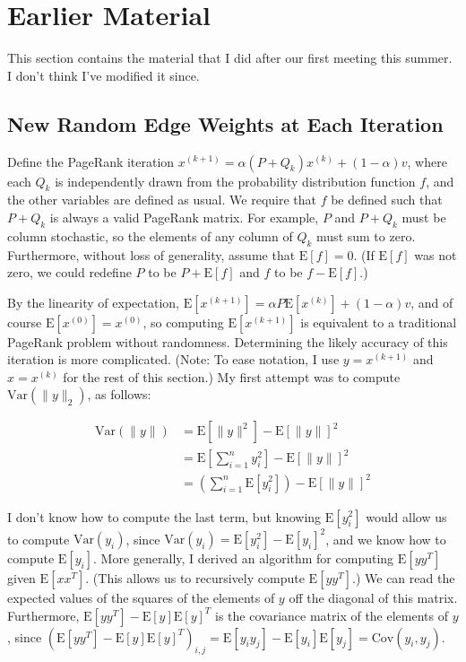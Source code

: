 \documentclass{article}
\newcommand \E[1] {\mathrm E \left[#1\right]} %
\newcommand \Var[1] {\mathrm {Var} \left(#1\right)} %
\newcommand \Cov[2] {\mathrm {Cov} (#1, #2)} %
\newcommand \vitr [2] {#1^{(#2)}} %
\begin{document}
\VerbatimFootnotes

\section{Earlier Material}

This section contains the material that I did after our first meeting this summer. I don't think I've modified it since.

\subsection{New Random Edge Weights at Each Iteration}

Define the PageRank iteration $\vitr x {k+1} =\alpha (P+Q_k)\vitr x k
+ (1-\alpha)v$, where each $Q_k$ is independently drawn from the
probability distribution function $f$, and the other variables are
defined as usual. We require that $f$ be defined such that $P+Q_k$ is
always a valid PageRank matrix. For example, $P$ and $P+Q_k$ must be
column stochastic, so the elements of any column of $Q_k$ must sum to
zero. Furthermore, without loss of generality, assume that $\E f =
0$. (If $\E f$ was not zero, we could redefine $P$ to be $P+\E f$ and
$f$ to be $f-\E f$.)

By the linearity of expectation, $\E {\vitr x {k+1}} = \alpha P
\E{\vitr x k} + (1-\alpha)v$, and of course $\E {\vitr x 0} = \vitr x
0$, so computing $\E {\vitr x {k+1}}$ is equivalent to a traditional
PageRank problem without randomness. Determining the likely accuracy
of this iteration is more complicated. (Note: To ease notation, I use
$y = \vitr x {k+1}$ and $x = \vitr x k$ for the rest of this section.)
My first attempt was to compute $\Var{\| y\|_2}$, as follows:

\begin{align*}
\Var{\|y\|} &= \E{\|y\|^2}-\E{\|y\|}^2\\ &= \E{\sum_{i=1}^n
  y_i^2}-\E{\|y\|}^2\\ &= \left(\sum_{i=1}^n
\E{y_i^2}\right)-\E{\|y\|}^2
\end{align*}

I don't know how to compute the last term, but knowing $\E{y_i^2}$
would allow us to compute $\Var{y_i}$, since
$\Var{y_i}=\E{y_i^2}-\E{y_i}^2$, and we know how to compute
$\E{y_i}$. More generally, I derived an algorithm for computing
$\E{yy^T}$ given $\E{xx^T}$. (This allows us to recursively compute
$\E{yy^T}$.) We can read the expected values of the squares of the
elements of $y$ off the diagonal of this matrix. Furthermore,
$\E{yy^T}-\E{y}\E{y}^T$ is the covariance matrix of the elements of
$y$, since
$\left(\E{yy^T}-\E{y}\E{y}^T\right)_{i,j}=\E{y_iy_j}-\E{y_i}\E{y_j}=\Cov{y_i}{y_j}$.
\end{document}
